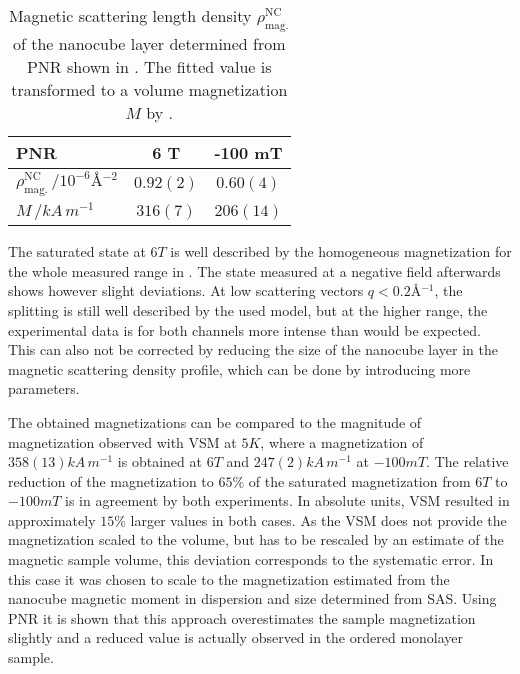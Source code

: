 \documentclass[\main/dresen_thesis.tex]{subfiles}
\begin{document}
  \begin{table}[!htbp]
    \centering
    \caption{\label{tab:monolayers:magneticStructure:pnrResult}Magnetic scattering length density $\rho_\mathrm{mag.}^\mathrm{NC}$ of the nanocube layer determined from PNR shown in . The fitted value is transformed to a volume magnetization $M$ by .}
    \begin{tabular}{l | c | c}
      \hline
      PNR & \textbf{6 T} & \textbf{-100 mT}\\
      \hline
      $\rho_\mathrm{mag.}^\mathrm{NC}\, / \unit{10^{-6} \angstrom^{-2}}$ & $0.92(2)$  & $0.60(4)$  \\
      \hline
      $M \, / \unit{kA \, m^{-1}}$                                       & $316(7)$   & $206(14)$  \\
      \hline
      \end{tabular}
  \end{table}

  The saturated state at $6 \unit{T}$ is well described by the homogeneous magnetization for the whole measured range in .
  The state measured at a negative field afterwards shows however slight deviations.
  At low scattering vectors $q < 0.2 \unit{\angstrom^{-1}}$, the splitting is still well described by the used model, but at the higher range, the experimental data is for both channels more intense than would be expected.
  This can also not be corrected by reducing the size of the nanocube layer in the magnetic scattering density profile, which can be done by introducing more parameters.

  The obtained magnetizations can be compared to the magnitude of magnetization observed with VSM at $5 \unit{K}$, where a magnetization of $358(13) \unit{kA \, m^{-1}}$ is obtained at $6 \unit{T}$ and $247(2) \unit{kA \, m^{-1}}$ at $-100 \unit{mT}$.
  The relative reduction of the magnetization to $65 \%$ of the saturated magnetization from $6 \unit{T}$ to $-100 \unit{mT}$ is in agreement by both experiments.
  In absolute units, VSM resulted in approximately $15 \%$ larger values in both cases.
  As the VSM does not provide the magnetization scaled to the volume, but has to be rescaled by an estimate of the magnetic sample volume, this deviation corresponds to the systematic error.
  In this case it was chosen to scale to the magnetization estimated from the nanocube magnetic moment in dispersion and size determined from SAS.
  Using PNR it is shown that this approach overestimates the sample magnetization slightly and a reduced value is actually observed in the ordered monolayer sample.
\end{document}
